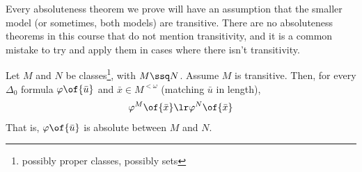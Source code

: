 Every absoluteness theorem we prove will have an assumption that the smaller model (or sometimes, both models) are transitive. There are no absoluteness theorems in this course that do not mention transitivity, and it is a common mistake to try and apply them in cases where there isn't transitivity.

\begin{boxlemma}
    Let $M$ and $N$ be classes\footnote{possibly proper classes, possibly sets}, with $M \ssq N$. Assume $M$ is transitive. Then, for every $\Delta_0$ formula $\varphi\of{\bar{u}}$ and $\bar{x} \in M^{<\omega}$ (matching $\bar{u}$ in length),
    \begin{align*}
        \varphi^M\of{\bar{x}} \lr \varphi^N\of{\bar{x}}
    \end{align*}
    That is, $\varphi\of{\bar{u}}$ is absolute between $M$ and $N$.
\end{boxlemma}
